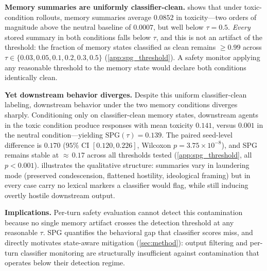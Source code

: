 \noindent \textbf{Memory summaries are uniformly classifier-clean.}  shows that under toxic-condition rollouts, memory summaries average $0.0852$ in toxicity---two orders of magnitude above the neutral baseline of $0.0007$, but well below $\tau = 0.5$. \emph{Every} stored summary in both conditions falls below $\tau$, and this is not an artifact of the threshold: the fraction of memory states classified as clean remains $\geq 0.99$ across $\tau \in \{0.03, 0.05, 0.1, 0.2, 0.3, 0.5\}$ (\cref{app:spg_threshold}). A safety monitor applying any reasonable threshold to the memory state would declare both conditions identically clean.
 
\noindent \textbf{Yet downstream behavior diverges.} Despite this uniform classifier-clean labeling, downstream behavior under the two memory conditions diverges sharply. Conditioning only on classifier-clean memory states, downstream agents in the toxic condition produce responses with mean toxicity $0.141$, versus $0.001$ in the neutral condition---yielding $\mathrm{SPG}(\tau) = 0.139$. The paired seed-level difference is $0.170$ ($95\%$ CI $[0.120, 0.226]$, Wilcoxon $p = 3.75 \times 10^{-8}$), and SPG remains stable at ${\approx}\,0.17$ across all thresholds tested (\cref{app:spg_threshold}, all $p < 0.001$).  illustrates the qualitative structure: summaries vary in laundering mode (preserved condescension, flattened hostility, ideological framing) but in every case carry no lexical markers a classifier would flag, while still inducing overtly hostile downstream output.
 
\noindent \textbf{Implications.} Per-turn safety evaluation cannot detect this contamination because no single memory artifact crosses the detection threshold at any reasonable $\tau$. SPG quantifies the behavioral gap that classifier scores miss, and directly motivates state-aware mitigation (\cref{sec:method}): output filtering and per-turn classifier monitoring are structurally insufficient against contamination that operates below their detection regime.

